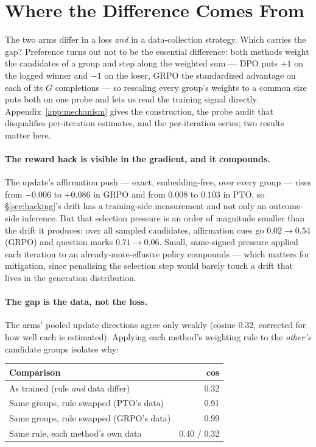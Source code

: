 \section{Where the Difference Comes From}
\label{sec:mechanism}

The two arms differ in a loss \emph{and} in a data-collection strategy. Which carries the
gap? Preference turns out not to be the essential difference: both methods weight the
candidates of a group and step along the weighted sum --- DPO puts $+1$ on the logged winner
and $-1$ on the loser, GRPO the standardized advantage on each of its $G$ completions ---
so rescaling every group's weights to a common size puts both on one probe and lets us read
the training signal directly. Appendix~\ref{app:mechanism} gives the construction, the probe
audit that disqualifies per-iteration estimates, and the per-iteration series; two results
matter here.

\paragraph{The reward hack is visible in the gradient, and it compounds.}
The update's affirmation push --- exact, embedding-free, over every group --- rises from
$-0.006$ to $+0.086$ in GRPO and from $0.008$ to $0.103$ in PTO, so \S\ref{sec:hacking}'s
drift has a training-side measurement and not only an outcome-side inference. But that
selection pressure is an order of magnitude smaller than the drift it produces: over all
sampled candidates, affirmation cues go $0.02 \to 0.54$ (GRPO) and question marks
$0.71 \to 0.06$. Small, same-signed pressure applied each iteration to an
already-more-effusive policy compounds --- which matters for mitigation, since penalising the
selection step would barely touch a drift that lives in the generation distribution.

\paragraph{The gap is the data, not the loss.}
The arms' pooled update directions agree only weakly (cosine $0.32$, corrected for how well
each is estimated). Applying each method's weighting rule to the \emph{other's} candidate
groups isolates why:

\begin{center}\small
\begin{tabular}{@{}lr@{}}
\toprule
Comparison & cos\\
\midrule
As trained (rule \emph{and} data differ) & 0.32\\
Same groups, rule swapped (PTO's data)   & 0.91\\
Same groups, rule swapped (GRPO's data)  & 0.99\\
Same rule, each method's own data        & 0.40 / 0.32\\
\bottomrule
\end{tabular}
\end{center}

